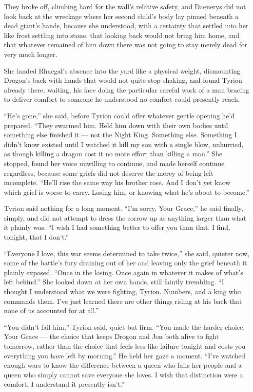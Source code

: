 They broke off, climbing hard for the wall’s relative safety, and Daenerys did not look back at the wreckage where her second child’s body lay pinned beneath a dead giant’s hands, because she understood, with a certainty that settled into her like frost settling into stone, that looking back would not bring him home, and that whatever remained of him down there was not going to stay merely dead for very much longer.

\sceneBreak

She landed Rhaegal’s absence into the yard like a physical weight, dismounting Drogon’s back with hands that would not quite stop shaking, and found Tyrion already there, waiting, his face doing the particular careful work of a man bracing to deliver comfort to someone he understood no comfort could presently reach.

“He’s gone,” she said, before Tyrion could offer whatever gentle opening he’d prepared. “They swarmed him. Held him down with their own bodies until something else finished it — not the Night King. Something else. Something I didn’t know existed until I watched it kill my son with a single blow, unhurried, as though killing a dragon cost it no more effort than killing a man.” She stopped, found her voice unwilling to continue, and made herself continue regardless, because some griefs did not deserve the mercy of being left incomplete. “He’ll rise the same way his brother rose. And I don’t yet know which grief is worse to carry. Losing him, or knowing what he’s about to become.”

Tyrion said nothing for a long moment. “I’m sorry, Your Grace,” he said finally, simply, and did not attempt to dress the sorrow up as anything larger than what it plainly was. “I wish I had something better to offer you than that. I find, tonight, that I don’t.”

“Everyone I love, this war seems determined to take twice,” she said, quieter now, some of the battle’s fury draining out of her and leaving only the grief beneath it plainly exposed. “Once in the losing. Once again in whatever it makes of what’s left behind.” She looked down at her own hands, still faintly trembling. “I thought I understood what we were fighting, Tyrion. Numbers, and a king who commands them. I’ve just learned there are other things riding at his back that none of us accounted for at all.”

“You didn’t fail him,” Tyrion said, quiet but firm. “You made the harder choice, Your Grace — the choice that keeps Drogon and Jon both alive to fight tomorrow, rather than the choice that feels less like failure tonight and costs you everything you have left by morning.” He held her gaze a moment. “I’ve watched enough wars to know the difference between a queen who fails her people and a queen who simply cannot save everyone she loves. I wish that distinction were a comfort. I understand it presently isn’t.”